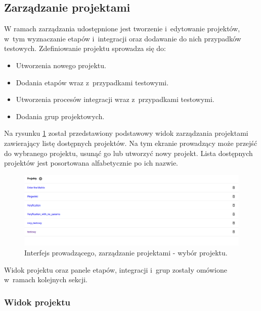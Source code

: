 \subsection{Zarządzanie projektami}
\label{lecturer-management}

W ramach zarządzania udostępnione jest tworzenie i~edytowanie projektów, w~tym wyznaczanie etapów i~integracji oraz dodawanie do nich przypadków testowych.
Zdefiniowanie projektu sprowadza się do:
\begin {itemize}
    \item Utworzenia nowego projektu.
    \item Dodania etapów wraz z~przypadkami testowymi.
    \item Utworzenia procesów integracji wraz z~przypadkami testowymi.
    \item Dodania grup projektowych.
\end {itemize}

Na rysunku \ref{fig:lecturer_projects_list} został przedstawiony podstawowy widok zarządzania projektami zawierający listę dostępnych projektów.
Na tym ekranie prowadzący może przejść do wybranego projektu, usunąć go lub utworzyć nowy projekt.
Lista dostępnych projektów jest posortowana alfabetycznie po ich nazwie.

\begin{figure}[h]
    \centering
    \includegraphics[width = 16cm]{chapter04/lecturer_projects_list.png}
    \caption{Interfejs prowadzącego, zarządzanie projektami - wybór projektu.}
    \label{fig:lecturer_projects_list}
\end{figure}

Widok projektu oraz panele etapów, integracji i~grup zostały omówione w~ramach kolejnych sekcji.

\subsubsection{Widok projektu}

